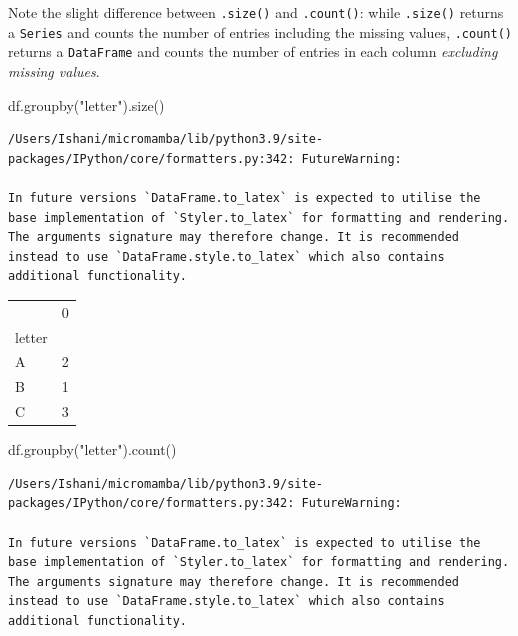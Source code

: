 \documentclass[
  letterpaper,
  DIV=11,
  numbers=noendperiod]{scrreprt}
\newenvironment{Shaded}{\begin{snugshade}}{\end{snugshade}}
\newcommand{\NormalTok}[1]{\textcolor[rgb]{0.00,0.23,0.31}{#1}}
\newcommand{\StringTok}[1]{\textcolor[rgb]{0.13,0.47,0.30}{#1}}
\begin{document}
Note the slight difference between \texttt{.size()} and
\texttt{.count()}: while \texttt{.size()} returns a \texttt{Series} and
counts the number of entries including the missing values,
\texttt{.count()} returns a \texttt{DataFrame} and counts the number of
entries in each column \emph{excluding missing values}.

\begin{Shaded}
\begin{Highlighting}[]
\NormalTok{df.groupby(}\StringTok{"letter"}\NormalTok{).size()}
\end{Highlighting}
\end{Shaded}

\begin{verbatim}
/Users/Ishani/micromamba/lib/python3.9/site-packages/IPython/core/formatters.py:342: FutureWarning:

In future versions `DataFrame.to_latex` is expected to utilise the base implementation of `Styler.to_latex` for formatting and rendering. The arguments signature may therefore change. It is recommended instead to use `DataFrame.style.to_latex` which also contains additional functionality.
\end{verbatim}

\begin{tabular}{lr}
\toprule
{} &  0 \\
letter &    \\
\midrule
A      &  2 \\
B      &  1 \\
C      &  3 \\
\bottomrule
\end{tabular}

\begin{Shaded}
\begin{Highlighting}[]
\NormalTok{df.groupby(}\StringTok{"letter"}\NormalTok{).count()}
\end{Highlighting}
\end{Shaded}

\begin{verbatim}
/Users/Ishani/micromamba/lib/python3.9/site-packages/IPython/core/formatters.py:342: FutureWarning:

In future versions `DataFrame.to_latex` is expected to utilise the base implementation of `Styler.to_latex` for formatting and rendering. The arguments signature may therefore change. It is recommended instead to use `DataFrame.style.to_latex` which also contains additional functionality.
\end{verbatim}
\end{document}
